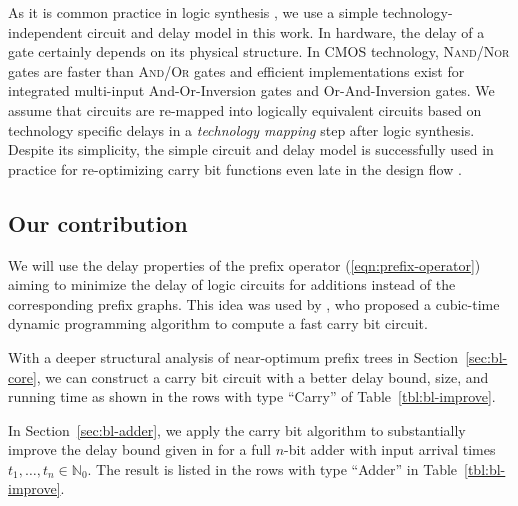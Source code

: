 \documentclass[11pt,final,microtype]{scrartcl}
\theoremstyle{plain}
\theoremstyle{definition}
\theoremstyle{remark}
\begin{document}
As it is common practice in logic synthesis
\cite{kogge-stone,ladner,bonnlogic,roy}, we use a simple technology-independent circuit and delay model in this work.  In
hardware, the delay of a gate certainly depends on its physical
structure.
In CMOS technology, \textsc{Nand}/\textsc{Nor} gates are faster than
\textsc{And}/\textsc{Or} gates and efficient implementations exist for
integrated multi-input {\sc And-Or}-Inversion gates and {\sc Or-And}-Inversion
gates. 
We assume that circuits are re-mapped into logically equivalent circuits
based on technology specific delays in a {\it technology mapping} step
\cite{keutzer88,Chatterjee+techmap2006} after logic synthesis.
Despite its simplicity, the simple circuit and delay model is
successfully used in practice for re-optimizing carry bit functions
even late in the design flow \cite{bonnlogic}.



\subsection{Our contribution}
We will use the delay properties of the prefix operator
(\ref{eqn:prefix-operator}) aiming to minimize the delay of logic
circuits for additions instead of the corresponding prefix
graphs. This idea was used by \cite{bonn1}, who proposed a cubic-time
dynamic programming algorithm to compute a fast carry bit circuit.

With a deeper structural analysis of near-optimum prefix trees in
Section~\ref{sec:bl-core}, we can construct a carry bit circuit with a
better delay bound, size, and running time as shown in the
rows with type ``Carry'' of Table~\ref{tbl:bl-improve}.

In Section~\ref{sec:bl-adder}, we apply the carry bit algorithm to
substantially improve the delay bound given in \cite{bonn2} for a full
$n$-bit adder with input arrival times $t_1, \dots, t_n \in
\mathbb{N}_0$. The result is listed in the rows with type ``Adder'' in
Table~\ref{tbl:bl-improve}.
\end{document}
